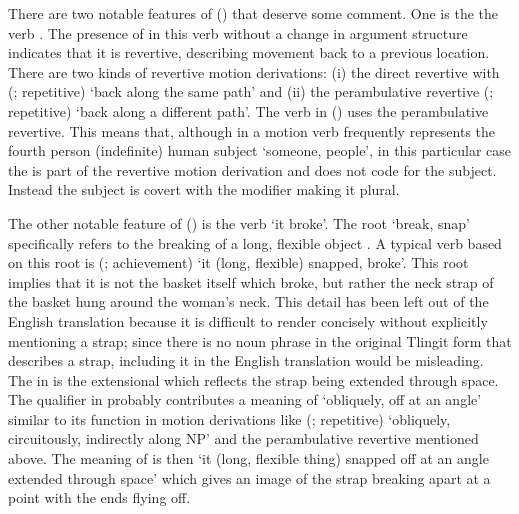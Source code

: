 There are two notable features of (\lastx) that deserve some comment.
One is the the verb .
The presence of  in this verb without a change in argument structure indicates that it is revertive, describing movement back to a previous location.
There are two kinds of revertive motion derivations: (i) the direct revertive with  (;  repetitive) ‘back along the same path’ and (ii) the perambulative revertive  (;  repetitive) ‘back along a different path’.
The verb  in (\lastx) uses the perambulative revertive.
This means that, although  in a motion verb frequently represents the fourth person (indefinite) human subject ‘someone, people’, in this particular case the  is part of the revertive motion derivation and does not code for the subject.
Instead the subject is covert with the modifier  making it plural.

The other notable feature of (\lastx) is the verb  ‘it broke’.
The root  ‘break, snap’ specifically refers to the breaking of a long, flexible object \parencite[780]{leer:1976}.
A typical verb based on this root is  (; achievement) ‘it (long, flexible) snapped, broke’.
This root implies that it is not the basket itself which broke, but rather the neck strap of the basket hung around the woman’s neck.
This detail has been left out of the English translation because it is difficult to render concisely without explicitly mentioning a strap; since there is no noun phrase in the original Tlingit form that describes a strap, including it in the English translation would be misleading.
The  in  is the extensional which reflects the strap being extended through space.
The  qualifier in  probably contributes a meaning of ‘obliquely, off at an angle’ similar to its function in motion derivations like  (;  repetitive) ‘obliquely, circuitously, indirectly along NP’ and the perambulative revertive mentioned above.
The meaning of  is then ‘it (long, flexible thing) snapped off at an angle extended through space’ which gives an image of the strap breaking apart at a point with the ends flying off.


